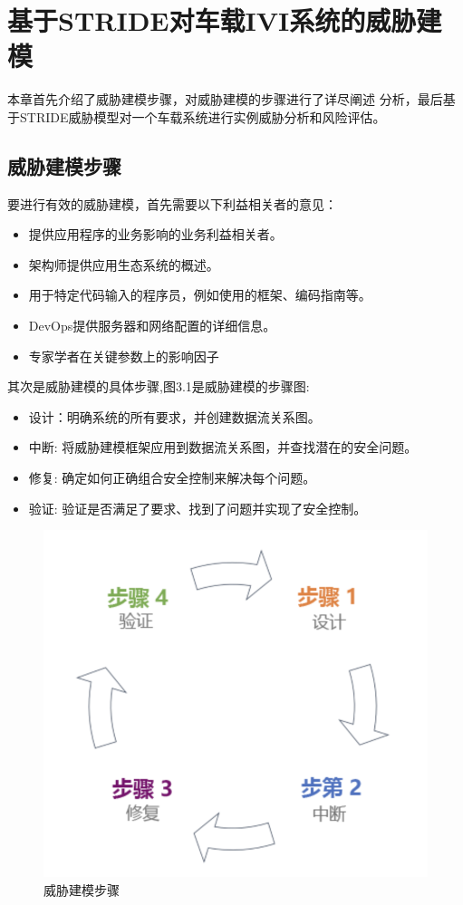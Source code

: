 \chapter{基于STRIDE对车载IVI系统的威胁建模}
\label{ch3}
本章首先介绍了威胁建模步骤，对威胁建模的步骤进行了详尽阐述
分析，最后基于STRIDE威胁模型对一个车载系统进行实例威胁分析和风险评估。
\section{威胁建模步骤}
要进行有效的威胁建模，首先需要以下利益相关者的意见：
  \begin{itemize}
    \item 提供应用程序的业务影响的业务利益相关者。
    \item 架构师提供应用生态系统的概述。
    \item 用于特定代码输入的程序员，例如使用的框架、编码指南等。
    \item DevOps提供服务器和网络配置的详细信息。
    \item 专家学者在关键参数上的影响因子
  \end{itemize}
  其次是威胁建模的具体步骤,图3.1是威胁建模的步骤图:
  \begin{itemize}
    \item 设计：明确系统的所有要求，并创建数据流关系图。
    \item 中断: 将威胁建模框架应用到数据流关系图，并查找潜在的安全问题。
    \item 修复: 确定如何正确组合安全控制来解决每个问题。
    \item 验证: 验证是否满足了要求、找到了问题并实现了安全控制。
  \end{itemize}
  \begin{figure}
    \centering
    \includegraphics[scale=0.6]{resources/img/i4.png}
    \caption{威胁建模步骤}
  \end{figure}

